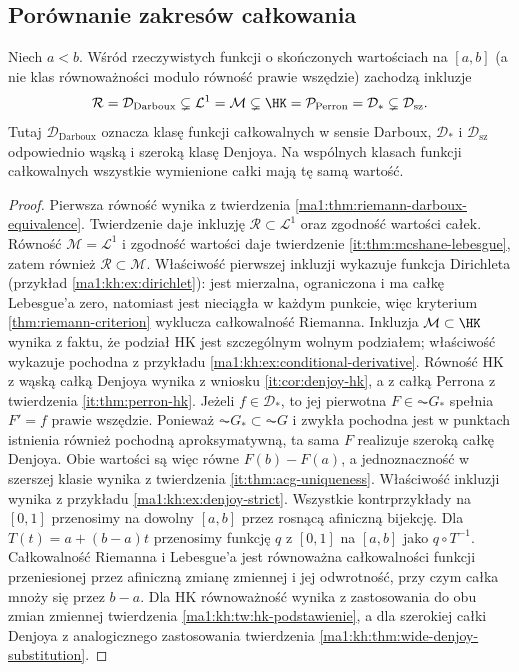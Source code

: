 \subsection{Porównanie zakresów całkowania}
\label{ma1:kh:sec:comparison}
\begin{twierdzenie}\label{ma1:kh:thm:integral-hierarchy}
Niech $a<b$. Wśród rzeczywistych funkcji o skończonych wartościach na $[a,b]$ (a nie klas równoważności modulo równość prawie wszędzie) zachodzą inkluzje
\[
 \mathcal R=\mathcal D_{\mathrm{Darboux}}
 \subsetneq\mathcal L^1=\mathcal M
 \subsetneq\HK=\mathcal P_{\mathrm{Perron}}=\mathcal D_*
 \subsetneq\mathcal D_{\mathrm{sz}}.
\]
Tutaj $\mathcal D_{\mathrm{Darboux}}$ oznacza klasę funkcji całkowalnych w sensie Darboux, $\mathcal D_*$ i $\mathcal D_{\mathrm{sz}}$ odpowiednio wąską i szeroką klasę Denjoya. Na wspólnych klasach funkcji całkowalnych wszystkie wymienione całki mają tę samą wartość.
\end{twierdzenie}
\begin{proof}
Pierwsza równość wynika z twierdzenia \ref{ma1:thm:riemann-darboux-equivalence}. Twierdzenie  daje inkluzję $\mathcal R\subset\mathcal L^1$ oraz zgodność wartości całek. Równość $\mathcal M=\mathcal L^1$ i zgodność wartości daje twierdzenie \ref{it:thm:mcshane-lebesgue}, zatem również $\mathcal R\subset\mathcal M$. Właściwość pierwszej inkluzji wykazuje funkcja Dirichleta (przykład \ref{ma1:kh:ex:dirichlet}): jest mierzalna, ograniczona i ma całkę Lebesgue'a zero, natomiast jest nieciągła w każdym punkcie, więc kryterium \ref{thm:riemann-criterion} wyklucza całkowalność Riemanna. Inkluzja $\mathcal M\subset\HK$ wynika z faktu, że podział HK jest szczególnym wolnym podziałem; właściwość wykazuje pochodna z przykładu \ref{ma1:kh:ex:conditional-derivative}. Równość HK z wąską całką Denjoya wynika z wniosku \ref{it:cor:denjoy-hk}, a z całką Perrona z twierdzenia \ref{it:thm:perron-hk}. Jeżeli $f\in\mathcal D_*$, to jej pierwotna $F\in\AC G_*$ spełnia $F'=f$ prawie wszędzie. Ponieważ $\AC G_*\subset\AC G$ i zwykła pochodna jest w punktach istnienia również pochodną aproksymatywną, ta sama $F$ realizuje szeroką całkę Denjoya. Obie wartości są więc równe $F(b)-F(a)$, a jednoznaczność w szerszej klasie wynika z twierdzenia \ref{it:thm:acg-uniqueness}. Właściwość inkluzji wynika z przykładu \ref{ma1:kh:ex:denjoy-strict}. Wszystkie kontrprzykłady na $[0,1]$ przenosimy na dowolny $[a,b]$ przez rosnącą afiniczną bijekcję. Dla $T(t)=a+(b-a)t$ przenosimy funkcję $q$ z $[0,1]$ na $[a,b]$ jako $q\circ T^{-1}$. Całkowalność Riemanna i Lebesgue'a jest równoważna całkowalności funkcji przeniesionej przez afiniczną zmianę zmiennej i jej odwrotność, przy czym całka mnoży się przez $b-a$. Dla HK równoważność wynika z zastosowania do obu zmian zmiennej twierdzenia \ref{ma1:kh:tw:hk-podstawienie}, a dla szerokiej całki Denjoya z analogicznego zastosowania twierdzenia \ref{ma1:kh:thm:wide-denjoy-substitution}.
\end{proof}
